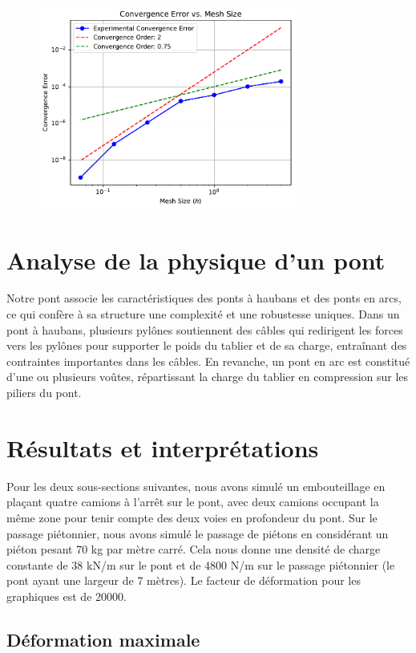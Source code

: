 \documentclass[conference]{IEEEtran}
\begin{document}
\begin{figure}[!htb]
    \centering
    \includegraphics[width=8.5cm]{Figures/convergence_plot.pdf}
    \label{fig:convergence}
\end{figure}

\section{Analyse de la physique d'un pont}

Notre pont associe les caractéristiques des ponts à haubans et des ponts en arcs, ce qui confère à sa structure une complexité et une robustesse uniques. Dans un pont à haubans, plusieurs pylônes soutiennent des câbles qui redirigent les forces vers les pylônes pour supporter le poids du tablier et de sa charge, entraînant des contraintes importantes dans les câbles. En revanche, un pont en arc est constitué d'une ou plusieurs voûtes, répartissant la charge du tablier en compression sur les piliers du pont.

\section{Résultats et interprétations}

Pour les deux sous-sections suivantes, nous avons simulé un embouteillage en plaçant quatre camions à l'arrêt sur le pont, avec deux camions occupant la même zone pour tenir compte des deux voies en profondeur du pont. Sur le passage piétonnier, nous avons simulé le passage de piétons en considérant un piéton pesant 70 kg par mètre carré. Cela nous donne une densité de charge constante de 38 kN/m sur le pont et de 4800 N/m sur le passage piétonnier (le pont ayant une largeur de 7 mètres). Le facteur de déformation pour les graphiques est de 20000.

\subsection{Déformation maximale}
\end{document}
